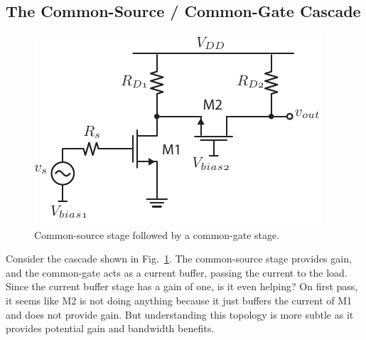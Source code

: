  






 



\section{\topicD}






\subsection{The Common-Source / Common-Gate Cascade}


\begin{figure}[tb]
\begin{center}
\includegraphics[scale=1]{10cs_cg_cascade}
\end{center}
\caption{Common-source stage followed by a common-gate stage.} \label{fig:10cs_cg_cascade}
\end{figure}

Consider the cascade shown in Fig.~\ref{fig:10cs_cg_cascade}.  The common-source stage provides gain, and the common-gate acts as a current buffer, passing the current to the load.  Since the current buffer stage has a gain of one, is it even helping?  On first pass, it seems like M2 is not doing anything because it just buffers the current of M1 and does not provide gain.  But understanding this topology is more subtle as it provides potential gain and bandwidth benefits.
 


